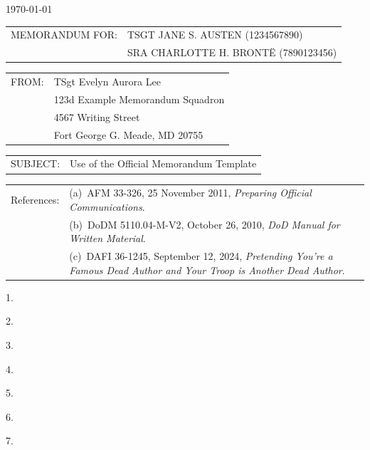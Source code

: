 \documentclass[12pt]{article}
\newlength{\extraSpaceLength}
\newcommand{\setcolumnwidth}[2]{
    \newlength{#1}%
    \settowidth{#1}{#2}%
    \addtolength{#1}{\extraSpaceLength} %
}
\begin{document}
\pagestyle{default}
\thispagestyle{firstpage}


\noindent\hfill\monthyeardate\today


\setcolumnwidth{\memoWidth}{MEMORANDUM FOR:}
\noindent
\begin{tabularx}{\textwidth}{@{} p{\memoWidth} @{} X @{}} 
MEMORANDUM FOR: & TSGT JANE S. AUSTEN (1234567890)\\
                & SRA CHARLOTTE H. BRONTË (7890123456)\\
\end{tabularx}

\setcolumnwidth{\fromWidth}{FROM:}
\noindent
\begin{tabularx}{\textwidth}{@{} p{\fromWidth} @{} X @{}} 
FROM: & TSgt Evelyn Aurora Lee\\
      & 123d Example Memorandum Squadron\\
      & 4567 Writing Street\\
      & Fort George G. Meade, MD 20755\\
\end{tabularx}

\setcolumnwidth{\subjectWidth}{SUBJECT:}
\noindent
\begin{tabularx}{\textwidth}{@{} p{\subjectWidth} @{} X @{}} 
SUBJECT: & Use of the Official Memorandum Template\\
\end{tabularx}

\setcolumnwidth{\referencesWidth}{References:}
\noindent
\begin{tabularx}{\textwidth}{@{} p{} @{} X @{}} 
References: & (a)~AFM 33-326, 25 November 2011, \textit{Preparing Official Communications}.\\
            & (b)~DoDM 5110.04-M-V2, October 26, 2010, \textit{DoD Manual for Written Material}.\\
            & (c)~DAFI 36-1245, September 12, 2024, \textit{Pretending You're a Famous Dead Author and Your Troop is Another Dead Author}.\\
\end{tabularx}

1.~\lipsum[1]

2.~\lipsum[1]

3.~\lipsum[1]

4.~\lipsum[1]

5.~\lipsum[1]

6.~\lipsum[1]

7.~\lipsum[1]

\end{document}
